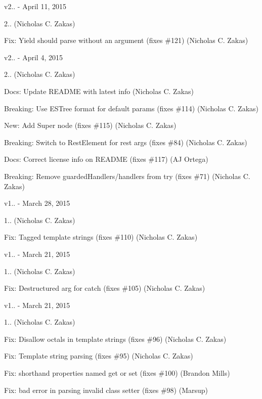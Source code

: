 v2.. -\/ April 11, 2015


\begin{DoxyItemize}
\item 2.. (Nicholas C. Zakas)
\item Fix\+: Yield should parse without an argument (fixes \#121) (Nicholas C. Zakas)
\end{DoxyItemize}

v2.. -\/ April 4, 2015


\begin{DoxyItemize}
\item 2.. (Nicholas C. Zakas)
\item Docs\+: Update R\+E\+A\+D\+ME with latest info (Nicholas C. Zakas)
\item Breaking\+: Use E\+S\+Tree format for default params (fixes \#114) (Nicholas C. Zakas)
\item New\+: Add Super node (fixes \#115) (Nicholas C. Zakas)
\item Breaking\+: Switch to Rest\+Element for rest args (fixes \#84) (Nicholas C. Zakas)
\item Docs\+: Correct license info on R\+E\+A\+D\+ME (fixes \#117) (AJ Ortega)
\item Breaking\+: Remove guarded\+Handlers/handlers from try (fixes \#71) (Nicholas C. Zakas)
\end{DoxyItemize}

v1.. -\/ March 28, 2015


\begin{DoxyItemize}
\item 1.. (Nicholas C. Zakas)
\item Fix\+: Tagged template strings (fixes \#110) (Nicholas C. Zakas)
\end{DoxyItemize}

v1.. -\/ March 21, 2015


\begin{DoxyItemize}
\item 1.. (Nicholas C. Zakas)
\item Fix\+: Destructured arg for catch (fixes \#105) (Nicholas C. Zakas)
\end{DoxyItemize}

v1.. -\/ March 21, 2015


\begin{DoxyItemize}
\item 1.. (Nicholas C. Zakas)
\item Fix\+: Disallow octals in template strings (fixes \#96) (Nicholas C. Zakas)
\item Fix\+: Template string parsing (fixes \#95) (Nicholas C. Zakas)
\item Fix\+: shorthand properties named get or set (fixes \#100) (Brandon Mills)
\item Fix\+: bad error in parsing invalid class setter (fixes \#98) (Marsup)
\end{DoxyItemize}

